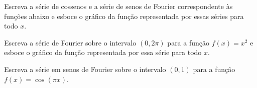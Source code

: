 \documentclass[a4paper,12pt, leqno, answers]{exam}
\begin{document}
\begin{questions}
    \question Escreva a s\'{e}rie de cossenos e a s\'{e}rie de senos de Fourier correspondente \`{a}s fun\c{c}\~{o}es abaixo e esboce o gr\'{a}fico da fun\c{c}\~{a}o representada por essas s\'{e}ries para todo $x$.

    \question Escreva a s\'{e}rie de Fourier sobre o intervalo $(0, 2\pi)$ para a fun\c{c}\~{a}o $f(x) = x^2$ e esboce o gr\'{a}fico da fun\c{c}\~{a}o representada por essa s\'{e}rie para todo $x$.
    \begin{solution}
    \end{solution}

    \question Escreva a s\'{e}rie em senos de Fourier sobre o intervalo $(0, 1)$ para a fun\c{c}\~{a}o $f(x) = \cos(\pi x)$.
    \begin{solution}
    \end{solution}
\end{questions}
% 
% 
\end{document}
